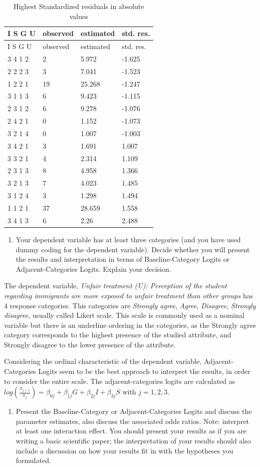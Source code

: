 \documentclass[
  12pt,
]{article}
\providecommand{\tightlist}{%
  \setlength{\itemsep}{0pt}\setlength{\parskip}{0pt}}
\begin{document}
\begin{longtable}[]{@{}llll@{}}
\caption{\label{tab:res}Highest Standardized residuals in absolute values}\tabularnewline
\toprule
I S G U & observed & estimated & std. res.\tabularnewline
\midrule
\endfirsthead
\toprule
I S G U & observed & estimated & std. res.\tabularnewline
\midrule
\endhead
3 4 1 2 & 2 & 5.972 & -1.625\tabularnewline
2 2 2 3 & 3 & 7.041 & -1.523\tabularnewline
1 2 2 1 & 19 & 25.268 & -1.247\tabularnewline
3 1 1 3 & 6 & 9.423 & -1.115\tabularnewline
2 3 1 2 & 6 & 9.278 & -1.076\tabularnewline
2 4 2 1 & 0 & 1.152 & -1.073\tabularnewline
3 2 1 4 & 0 & 1.007 & -1.003\tabularnewline
3 4 2 1 & 3 & 1.691 & 1.007\tabularnewline
3 3 2 1 & 4 & 2.314 & 1.109\tabularnewline
2 3 1 3 & 8 & 4.958 & 1.366\tabularnewline
3 2 1 3 & 7 & 4.023 & 1.485\tabularnewline
3 1 2 4 & 3 & 1.298 & 1.494\tabularnewline
1 1 2 1 & 37 & 28.659 & 1.558\tabularnewline
3 4 1 3 & 6 & 2.26 & 2.488\tabularnewline
\bottomrule
\end{longtable}

\begin{enumerate}
\def\labelenumi{\arabic{enumi}.}
\setcounter{enumi}{5}
\tightlist
\item
  Your dependent variable has at least three categories (and you have used dummy coding for the dependent variable). Decide whether you will present the results and interpretation in terms of Baseline-Category Logits or Adjacent-Categories Logits. Explain your decision.
\end{enumerate}

The dependent variable, \emph{Unfair treatment (U): Perception of the student regarding immigrants are more exposed to unfair treatment than other groups} has 4 response categories. This categories are \emph{Strongly agree}, \emph{Agree}, \emph{Disagree}, \emph{Strongly disagree}, usually called Likert scale. This scale is commonly used as a nominal variable but there is an underline ordering in the categories, as the Strongly agree category corresponds to the highest presence of the studied attribute, and Strongly disagree to the lower presence of the attribute.

Considering the ordinal characteristic of the dependent variable, Adjacent-Categories Logits seem to be the best approach to interpret the results, in order to consider the entire scale. The adjacent-categories logits are calculated as \(log(\frac{\pi_{j+1}}{\pi_j})=\beta_{0j}+\beta_{1j}G+\beta_{2j}I+\beta_{3j}S\) with \(j=1,2,3\).

\begin{enumerate}
\def\labelenumi{\arabic{enumi}.}
\setcounter{enumi}{6}
\tightlist
\item
  Present the Baseline-Category or Adjacent-Categories Logits and discuss the parameter estimates, also discuss the associated odds ratios. Note: interpret at least one interaction effect. You should present your results as if you are writing a basic scientific paper; the interpretation of your results should also include a discussion on how your results fit in with the hypotheses you formulated.
\end{enumerate}
\end{document}

